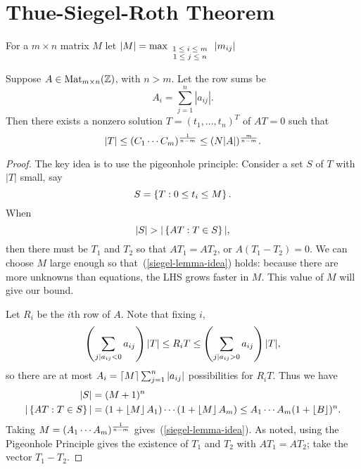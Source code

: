 \section{Thue-Siegel-Roth Theorem}
\begin{lem}
For a $m\times n$ matrix $M$ let $|M|=\max_{\scriptsize\begin{array}{c} 1\le i\le m\\1\le j\le n\end{array}}|m_{ij}|$

Suppose $A\in \operatorname{Mat}_{m\times n}(\mathbb{Z})$, with $n>m$. Let the row sums be
\[
A_i=\sum_{j=1}^n|a_{ij}|.
\]
Then there exists a nonzero solution $T=(t_1,\ldots, t_n)^T$ of 
$AT=0$ 
such that
\[
|T|\le (C_1\cdots C_m)^{\frac{1}{n-m}}\le (N|A|)^{\frac{m}{n-m}}.
\]
\end{lem}
\begin{proof}
The key idea is to use the pigeonhole principle: 
Consider a set $S$ of $T$ with $|T|$ small, say 
\[S=\left\{{T}:{0\le t_i\le M}\right\}.\]
When 
\begin{equation}\label{siegel-lemma-idea}
|S|>|\set{AT}{T\in S}|,
\end{equation}
then there must be $T_1$ and $T_2$ so that $AT_1=AT_2$, or $A(T_1-T_2)=0$. We can choose $M$ large enough so that~(\ref{siegel-lemma-idea}) holds: because there are more unknowns than equations, the LHS grows faster in $M$. This value of $M$ will give our bound.

Let $R_i$ be the $i$th row of $A$. Note that fixing $i$,
\[
\left( {\sum_{j\mid a_{ij}<0}a_{ij}} \right)|T| \le R_iT \le\left( {\sum_{j\mid a_{ij}>0}a_{ij}} \right)|T|,
\]
so there are at most $A_i=\left\lceil {M}\right\rceil\sum_{j=1}^n|a_{ij}|$ possibilities for $R_iT$. Thus we have
\begin{align*}
|S|&=(M+1)^n\\
|\left\{{AT}:{T\in S}\right\}|&=(1+\left\lfloor {M}\right\rfloor A_1)\cdots (1+\left\lfloor {M}\right\rfloor A_m)\le A_1\cdots A_m (1+\left\lfloor {B}\right\rfloor)^n.
\end{align*}
Taking $M=(A_1\cdots A_m)^{\frac{1}{n-m}}$ gives~(\ref{siegel-lemma-idea}). As noted, using the Pigeonhole Principle gives the existence of $T_1$ and $T_2$ with $AT_1=AT_2$; take the vector $T_1-T_2$.
\end{proof}
